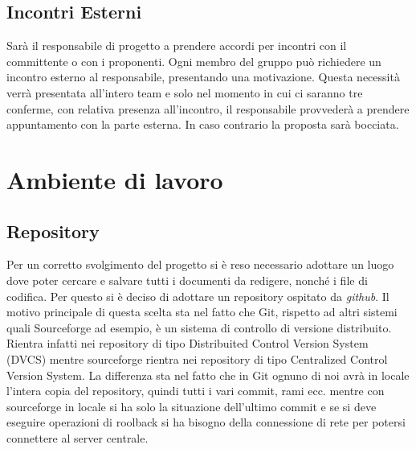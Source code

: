\subsection{Incontri Esterni}
Sarà il responsabile di progetto a prendere accordi per incontri con il committente o con i proponenti.
Ogni membro del gruppo può richiedere un incontro esterno al responsabile, presentando una motivazione. Questa necessità verrà presentata all'intero team e solo nel momento in cui ci saranno tre conferme, con relativa presenza all'incontro, il responsabile provvederà a prendere appuntamento con la parte esterna. In caso contrario la proposta sarà bocciata.

\newpage
\section{Ambiente di lavoro}
\subsection{Repository}
Per un corretto svolgimento del progetto si è reso necessario adottare un luogo dove poter cercare e salvare tutti i documenti da redigere, nonché i file di codifica. Per questo si è deciso di adottare un repository ospitato da \textit{github}. Il motivo principale di questa scelta sta nel fatto che Git, rispetto ad altri sistemi quali Sourceforge ad esempio, è un sistema di controllo di versione distribuito. Rientra infatti nei repository di tipo Distribuited Control Version System (DVCS) mentre sourceforge rientra nei repository di tipo Centralized Control Version System. La differenza sta nel fatto che in Git ognuno di noi avrà in locale l'intera copia del repository, quindi tutti i vari commit, rami ecc. mentre con sourceforge in locale si ha solo la situazione dell'ultimo commit e se si deve eseguire operazioni di roolback si ha bisogno della connessione di rete per potersi connettere al server centrale.

